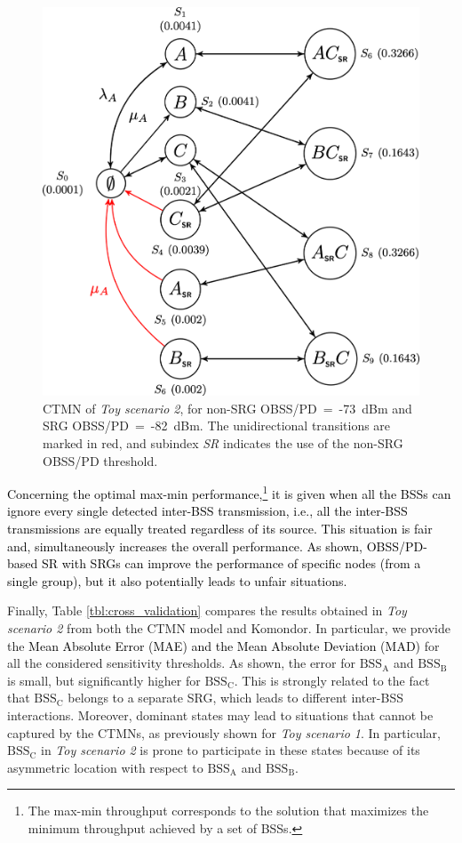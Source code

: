 \documentclass[preprint,12pt]{elsarticle}
\theoremstyle{plain}
\begin{document}
\begin{figure}[ht]
	\centering
	\includegraphics[width=.45\columnwidth]{ctmn_scenario_2}
	\caption{CTMN of \emph{Toy scenario 2}, for non-SRG OBSS/PD~=~-73~dBm and SRG OBSS/PD~=~-82~dBm. The unidirectional transitions are marked in red, and subindex \emph{SR} indicates the use of the non-SRG OBSS/PD threshold.}
	\label{fig:ctmn_scenario_2}
\end{figure}

\textcolor{black}{Concerning the optimal max-min performance,\footnote{The max-min throughput corresponds to the solution that maximizes the minimum throughput achieved by a set of BSSs.} \textcolor{black}{it is given} when all the BSSs can ignore every single detected inter-BSS transmission, i.e., all the inter-BSS transmissions are equally treated regardless of its source. This situation is fair and, simultaneously increases the overall performance. As shown, OBSS/PD-based SR with SRGs can improve the performance of specific nodes (from a single group), but it also potentially leads to unfair situations. }

Finally, Table \ref{tbl:cross_validation} compares the results obtained in \emph{Toy scenario 2} from both the CTMN model and Komondor. In particular, we provide the \textcolor{black}{Mean Absolute Error (MAE) and the Mean Absolute Deviation (MAD)} for all the considered sensitivity thresholds. As shown, the error for  $\text{BSS}_\text{A}$ and $\text{BSS}_\text{B}$ is small, but significantly higher for $\text{BSS}_\text{C}$. This is strongly related to the fact that $\text{BSS}_\text{C}$ belongs to a separate SRG, which leads to different inter-BSS interactions. Moreover, dominant states may lead to situations that cannot be captured by the CTMNs, as previously shown for \emph{Toy scenario 1}. In particular, $\text{BSS}_\text{C}$ in \emph{Toy scenario 2} is prone to participate in these states because of its asymmetric location with respect to $\text{BSS}_\text{A}$ and $\text{BSS}_\text{B}$.
\end{document}
